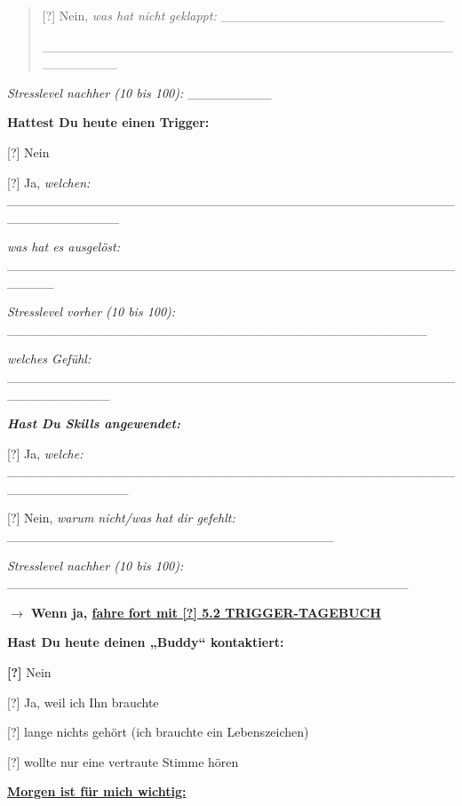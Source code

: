 \begin{quote}
[?] Nein, \emph{was hat nicht geklappt:} \_\_\_\_\_\_\_\_\_\_\_\_\_\_\_\_\_\_\_\_\_\_\_\_

\_\_\_\_\_\_\_\_\_\_\_\_\_\_\_\_\_\_\_\_\_\_\_\_\_\_\_\_\_\_\_\_\_\_\_\_\_\_\_\_\_\_\_\_\_\_\_\_\_\_\_\_
\end{quote}

\emph{Stresslevel nachher (10 bis 100):} \_\_\_\_\_\_\_\_\_

\textbf{Hattest Du heute einen Trigger:}

[?] Nein

[?] Ja, \emph{welchen:} \_\_\_\_\_\_\_\_\_\_\_\_\_\_\_\_\_\_\_\_\_\_\_\_\_\_\_\_\_\_\_\_\_\_\_\_\_\_\_\_\_\_\_\_\_\_\_\_\_\_\_\_\_\_\_\_\_\_\_\_

\emph{was hat es ausgelöst:} \_\_\_\_\_\_\_\_\_\_\_\_\_\_\_\_\_\_\_\_\_\_\_\_\_\_\_\_\_\_\_\_\_\_\_\_\_\_\_\_\_\_\_\_\_\_\_\_\_\_\_\_\_

\emph{Stresslevel vorher (10 bis 100):} \_\_\_\_\_\_\_\_\_\_\_\_\_\_\_\_\_\_\_\_\_\_\_\_\_\_\_\_\_\_\_\_\_\_\_\_\_\_\_\_\_\_\_\_\_

\emph{welches Gefühl:} \_\_\_\_\_\_\_\_\_\_\_\_\_\_\_\_\_\_\_\_\_\_\_\_\_\_\_\_\_\_\_\_\_\_\_\_\_\_\_\_\_\_\_\_\_\_\_\_\_\_\_\_\_\_\_\_\_\_\_

\emph{\textbf{Hast Du Skills angewendet:}}

[?] Ja, \emph{welche:} \_\_\_\_\_\_\_\_\_\_\_\_\_\_\_\_\_\_\_\_\_\_\_\_\_\_\_\_\_\_\_\_\_\_\_\_\_\_\_\_\_\_\_\_\_\_\_\_\_\_\_\_\_\_\_\_\_\_\_\_\_

[?] Nein, \emph{warum nicht/was hat dir gefehlt:} \_\_\_\_\_\_\_\_\_\_\_\_\_\_\_\_\_\_\_\_\_\_\_\_\_\_\_\_\_\_\_\_\_\_\_

\emph{Stresslevel nachher (10 bis 100):} \_\_\_\_\_\_\_\_\_\_\_\_\_\_\_\_\_\_\_\_\_\_\_\_\_\_\_\_\_\_\_\_\_\_\_\_\_\_\_\_\_\_\_

\textbf{$\rightarrow$ Wenn ja, \ul{fahre fort mit [?] 5.2 TRIGGER-TAGEBUCH}}

\textbf{Hast Du heute deinen „Buddy`` kontaktiert:}

\textbf{[?]} Nein

[?] Ja, weil ich Ihn brauchte

[?] lange nichts gehört (ich brauchte ein Lebenszeichen)

[?] wollte nur eine vertraute Stimme hören

\textbf{\ul{Morgen ist für mich wichtig:}}

